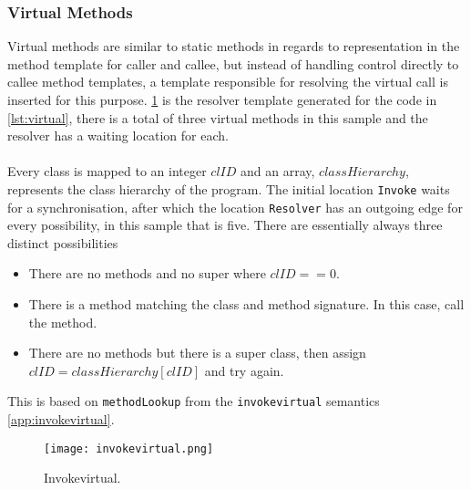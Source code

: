 \subsubsection{Virtual Methods}
Virtual methods are similar to static methods in regards to representation in the method template for caller and callee, but instead of handling control directly to callee method templates, a template responsible for resolving the virtual call is inserted for this purpose.
\cref{fig:invokevirtual} is the resolver template generated for the code in \cref{lst:virtual}, there is a total of three virtual methods in this sample and the resolver has a waiting location for each.\\\\
Every class is mapped to an integer $clID$ and an array, $classHierarchy$, represents the class hierarchy of the program. The initial location \texttt{Invoke} waits for a synchronisation, after which the location \texttt{Resolver} has an outgoing edge for every possibility, in this sample that is five. There are essentially always three distinct possibilities 

\begin{itemize}
\item There are no methods and no super where $clID == 0$.
\item There is a method matching the class and method signature. In this case, call the method.
\item There are no methods but there is a super class, then assign $clID = classHierarchy[clID]$ and try again.
\end{itemize}

This is based on \texttt{methodLookup} from the \texttt{invokevirtual} semantics \cref{app:invokevirtual}.

 
\begin{figure}[H]
\centering
\texttt{[image: invokevirtual.png]}
\caption{Invokevirtual.}
\label{fig:invokevirtual}
\end{figure}



